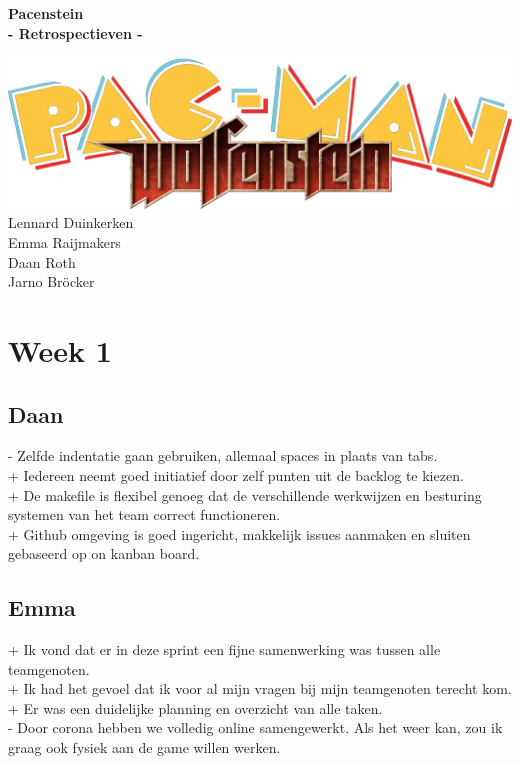\documentclass{article}
\begin{document}
\begin{titlepage}
    \centering
    \vfill
    \bfseries\Huge{Pacenstein\\\large{- Retrospectieven -}}\\
    \normalfont\normalsize{}
    \vfill

    \includegraphics[width=\textwidth]{../res/pacenstein.png}
    \vfill
    \large{
        Lennard Duinkerken\\
        Emma Raijmakers\\
        Daan Roth\\
        Jarno Bröcker
    }
    \vfill
\end{titlepage}

\newpage
\tableofcontents
\newpage

\section{Week 1} %
\label{sec:week_1}

\subsection{Daan} %
\label{sub:daan}
- Zelfde indentatie gaan gebruiken, allemaal spaces in plaats van tabs.\\
+ Iedereen neemt goed initiatief door zelf punten uit de backlog te kiezen.\\
+ De makefile is flexibel genoeg dat de verschillende werkwijzen en besturing systemen van het team correct functioneren.\\
+ Github omgeving is goed ingericht, makkelijk issues aanmaken en sluiten gebaseerd op on kanban board.

\subsection{Emma} %
\label{sub:emma}
+ Ik vond dat er in deze sprint een fijne samenwerking was tussen alle teamgenoten.\\
+ Ik had het gevoel dat ik voor al mijn vragen bij mijn teamgenoten terecht kom.\\
+ Er was een duidelijke planning en overzicht van alle taken.\\
- Door corona hebben we volledig online samengewerkt. Als het weer kan, zou ik graag ook fysiek aan de game willen werken.
\end{document}

